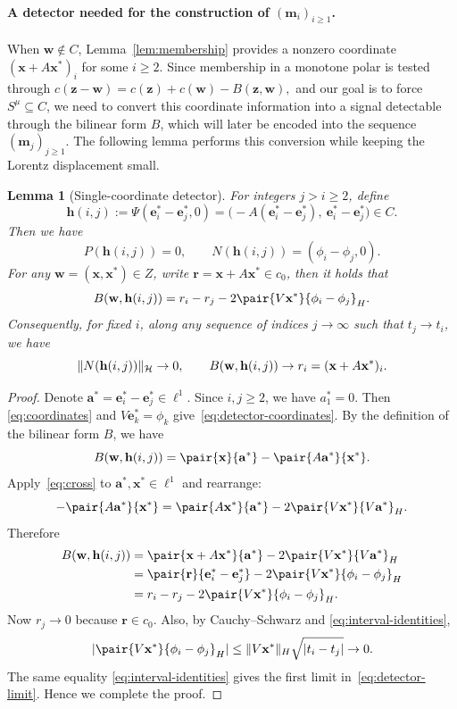 \documentclass[11pt,a4paper]{article}
\theoremstyle{reportstyle}
\newtheorem{lemma}{Lemma}
\numberwithin{equation}{section}
\newcommand{\HH}{\mathcal H}
\newcommand{\bx}{\mathbf x}
\newcommand{\ba}{\mathbf a}
\newcommand{\be}{\mathbf e}
\newcommand{\br}{\mathbf r}
\newcommand{\bz}{\mathbf z}
\newcommand{\bm}{\mathbf m}
\newcommand{\bw}{\mathbf w}
\newcommand{\bh}{\mathbf h}
\DeclarePairedDelimiter{\norm}{\lVert}{\rVert}
\DeclarePairedDelimiter{\abs}{\lvert}{\rvert}
\begin{document}
	\paragraph{A detector needed for the construction of $(\bm_i)_{i\geq1}$.}
	When $\bw\notin C$, Lemma~\ref{lem:membership} provides a nonzero coordinate $(\bx+A\bx^*)_i$ for some $i\ge2$. Since membership in a monotone polar is tested through $c(\bz-\bw)=c(\bz)+c(\bw)-B(\bz,\bw),$
	and our goal is to force $S^\mu\subseteq C$, we need to convert this coordinate information into a signal detectable through the bilinear form $B$, which will later be encoded into the sequence $(\bm_j)_{j\ge1}$. The following lemma performs this conversion while keeping the Lorentz displacement small.

	\begin{lemma}[Single-coordinate detector]
		\label{lem:detector}
		For integers $j>i\ge2$, define
		\begin{equation*}
			\bh(i,j):=\Psi(\be_i^*-\be_j^*,0) =\bigl(-A(\be_i^*-\be_j^*),\ \be_i^*-\be_j^*\bigr)\in C.
		\end{equation*}
		Then we have
		\begin{equation}
			P(\bh(i,j))=0, \qquad N(\bh(i,j))=(\phi_i-\phi_j,0).
			\label{eq:detector-coordinates}
		\end{equation}
		For any $\bw=(\bx,\bx^*)\in Z$, write $\br=\bx+A\bx^*\in c_0$, then it holds that
		\begin{equation*}
			B(\bw,\bh(i,j)) =r_i-r_j-2\pair{V\bx^*}{\phi_i-\phi_j}_H.
		\end{equation*}
		Consequently, for fixed $i$, along any sequence of indices $j\to\infty$
		such that $t_j\to t_i$, we have
		\begin{equation}
			\norm{N(\bh(i,j))}_{\HH}\rightarrow0, \qquad B(\bw,\bh(i,j))\rightarrow r_i = (\bx+A\bx^*)_i.
			\label{eq:detector-limit}
		\end{equation}
	\end{lemma}

	\begin{proof}
		Denote $\ba^*=\be_i^*-\be_j^*\in\ell^1$. Since $i,j\ge2$, we have $a^*_1=0$. Then \eqref{eq:coordinates} and
		$V\be_k^*=\phi_k$ give~\eqref{eq:detector-coordinates}. By the definition of the bilinear form $B$, we have
		$$ B(\bw,\bh(i,j))=\pair{\bx}{\ba^*}-\pair{A\ba^*}{\bx^*}. $$
		Apply~\eqref{eq:cross} to $\ba^*,\bx^*\in\ell^1$ and rearrange:
		$$ -\pair{A\ba^*}{\bx^*} = \pair{A\bx^*}{\ba^*} -2\pair{V\bx^*}{V\ba^*}_H. $$
		Therefore
		\begin{align*}
			B(\bw,\bh(i,j)) &=\pair{\bx+A\bx^*}{\ba^*} - 2\pair{V\bx^*}{V\ba^*}_H\\
			&=\pair{\br}{\be_i^*-\be_j^*} -2\pair{V\bx^*}{\phi_i-\phi_j}_H\\
			&=r_i-r_j-2\pair{V\bx^*}{\phi_i-\phi_j}_H.
		\end{align*}
		Now $r_j\to0$ because $\br\in c_0$. Also, by Cauchy--Schwarz and
		\eqref{eq:interval-identities},
		$$ \abs{\pair{V\bx^*}{\phi_i-\phi_j}_H} \le\norm{V\bx^*}_H\sqrt{\abs{t_i-t_j}}\rightarrow0. $$
		The same equality \eqref{eq:interval-identities} gives the first limit in~\eqref{eq:detector-limit}. Hence we complete the proof.
	\end{proof}
\end{document}
